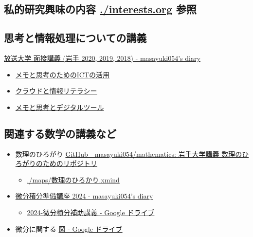 \documentclass[dvipdfmx,11pat]{jarticle}
\begin{document}
\subsection{私的研究興味の内容 \url{./interests.org} 参照}
\label{sec:orgec66225}

\subsection{思考と情報処理についての講義}
\label{sec:org61f8ba0}
\href{https://masayuki054.hatenablog.com/entry/2019/12/09/102219}{放送大学 面接講義 (岩手 2020, 2019, 2018) - masayuki054's diary}
\begin{itemize}
\item \href{https://masayuki054.github.io/ict\_literacy\_for\_thinking\_and\_memo/}{メモと思考のためのICTの活用}
\item \href{https://masayuki054.github.io/cloud\_and\_information\_literacy/talk.html}{クラウドと情報リテラシー}
\item \href{https://masayuki054.github.io/tools\_for\_thinking\_and\_memo/talk.html}{メモと思考とデジタルツール}
\end{itemize}
\subsection{関連する数学の講義など}
\label{sec:orgf995c1a}
\begin{itemize}
\item 数理のひろがり \href{https://github.com/masayuki054/mathematics/tree/main}{GitHub - masayuki054/mathematics: 岩手大学講義 数理のひろがりのためのリポジトリ}
\begin{itemize}
\item \url{./maps/数理のひろかり.xmind}
\end{itemize}
\item \href{https://masayuki054.hatenablog.com/entry/2024/04/09/225336\#orgfce19b2}{微分積分準備講座 2024 - masayuki054's diary}
\begin{itemize}
\item \href{https://drive.google.com/drive/folders/1fYNIqpHaGYXFeuLxqppoT9cEUCEcmbXp}{2024-微分積分補助講義 - Google ドライブ}
\end{itemize}
\item 微分に関する \href{https://drive.google.com/drive/folders/1lY6qb2Z02iAD\_WdesHNMpmsGecY3ynDa}{図 - Google ドライブ}
\end{itemize}
\end{document}
